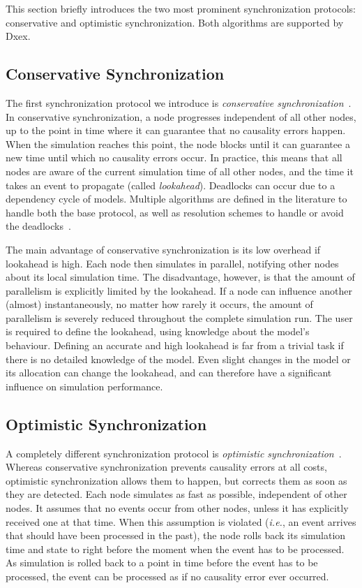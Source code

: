 This section briefly introduces the two most prominent synchronization protocols: conservative and optimistic synchronization.
Both algorithms are supported by Dxex.

\subsection{Conservative Synchronization}
The first synchronization protocol we introduce is \textit{conservative synchronization}~\cite{FujimotoBook}.
In conservative synchronization, a node progresses independent of all other nodes, up to the point in time where it can guarantee that no causality errors happen.
When the simulation reaches this point, the node blocks until it can guarantee a new time until which no causality errors occur.
In practice, this means that all nodes are aware of the current simulation time of all other nodes, and the time it takes an event to propagate (called \textit{lookahead}).
Deadlocks can occur due to a dependency cycle of models.
Multiple algorithms are defined in the literature to handle both the base protocol, as well as resolution schemes to handle or avoid the deadlocks~\cite{FujimotoBook}.

The main advantage of conservative synchronization is its low overhead if lookahead is high.
Each node then simulates in parallel, notifying other nodes about its local simulation time.
The disadvantage, however, is that the amount of parallelism is explicitly limited by the lookahead.
If a node can influence another (almost) instantaneously, no matter how rarely it occurs, the amount of parallelism is severely reduced throughout the complete simulation run.
The user is required to define the lookahead, using knowledge about the model's behaviour.
Defining an accurate and high lookahead is far from a trivial task if there is no detailed knowledge of the model.
Even slight changes in the model or its allocation can change the lookahead, and can therefore have a significant influence on simulation performance.

\subsection{Optimistic Synchronization}
A completely different synchronization protocol is \textit{optimistic synchronization}~\cite{TimeWarp}.
Whereas conservative synchronization prevents causality errors at all costs, optimistic synchronization allows them to happen, but corrects them as soon as they are detected.
Each node simulates as fast as possible, independent of other nodes.
It assumes that no events occur from other nodes, unless it has explicitly received one at that time.
When this assumption is violated (\textit{i.e.}, an event arrives that should have been processed in the past), the node rolls back its simulation time and state to right before the moment when the event has to be processed.
As simulation is rolled back to a point in time before the event has to be processed, the event can be processed as if no causality error ever occurred.

